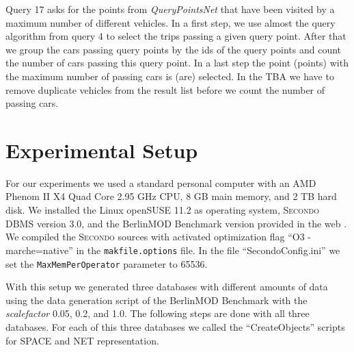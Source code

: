 \documentclass[a4paper]{article}
\newcommand{\secondo}{\textsc{Secondo}}
\newcommand{\bmodb} {BerlinMOD Benchmark}
\begin{document}
Query 17 asks for the points from \textit{QueryPointsNet} that have been visited by a
maximum number of different vehicles. In a first step, we use almost the query
algorithm from query 4 to select the trips passing a given query
point. After that we group the cars passing query points by the ids of the
query points and count the number of cars passing this query point. In a last
step the point (points) with the maximum number of passing cars is (are)
selected.
In the TBA we have to remove duplicate vehicles from the result list before we
count the number of passing cars.
\section{Experimental Setup}
\label{sec:scenario}
For our experiments we used a standard personal computer with an AMD Phenom II
X4 Quad Core 2.95 GHz CPU, 8 GB main memory, and 2 TB hard disk. We installed the
Linux openSUSE 11.2 as operating system, \secondo{} DBMS version 3.0, and
the \bmodb{} version provided in the web \cite{NetworkWeb}. We compiled the
\secondo{} sources with activated optimization flag ``O3 -marche=native'' in the
\texttt{makfile.options} file. In the file ``SecondoConfig.ini'' we set the
\texttt{MaxMemPerOperator} parameter to 65536.

With this setup we generated three databases with different amounts of data 
using the data generation script of the \bmodb{} with the \textit{scalefactor} 
0.05, 0.2, and 1.0. The following steps are done with all three databases. For 
each of this three databases we called the ``CreateObjects'' scripts for
SPACE and NET representation.
\end{document}
